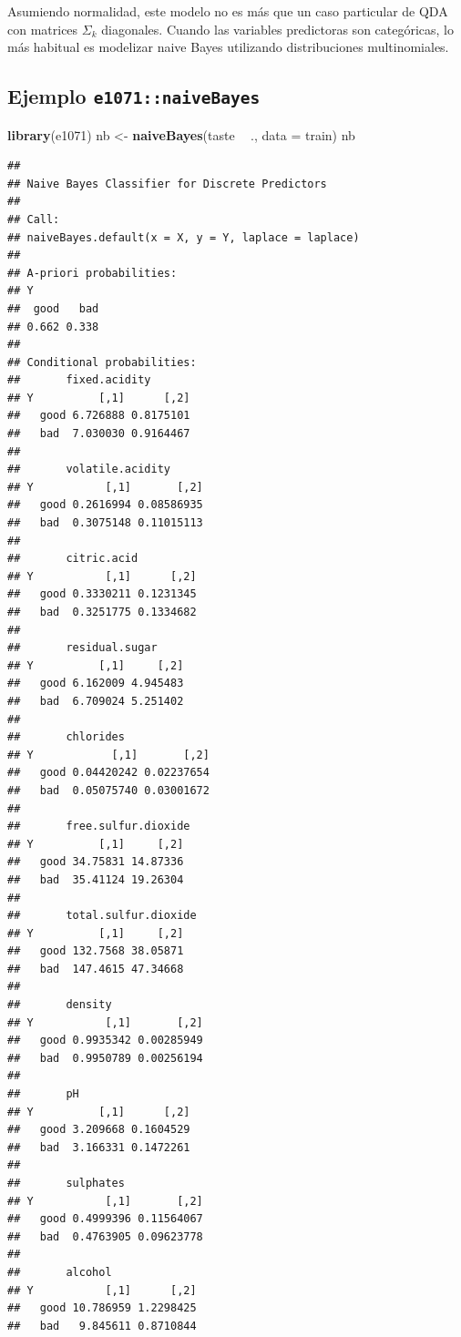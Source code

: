 \documentclass[
  spanish,
]{book}
\newenvironment{Shaded}{\begin{snugshade}}{\end{snugshade}}
\newcommand{\DataTypeTok}[1]{\textcolor[rgb]{0.13,0.29,0.53}{#1}}
\newcommand{\KeywordTok}[1]{\textcolor[rgb]{0.13,0.29,0.53}{\textbf{#1}}}
\newcommand{\NormalTok}[1]{#1}
\newcommand{\OperatorTok}[1]{\textcolor[rgb]{0.81,0.36,0.00}{\textbf{#1}}}
\newcommand{\StringTok}[1]{\textcolor[rgb]{0.31,0.60,0.02}{#1}}
\theoremstyle{break}
\theoremstyle{definition}
\theoremstyle{definition}
\theoremstyle{definition}
\theoremstyle{remark}
\begin{document}
Asumiendo normalidad, este modelo no es más que un caso particular de QDA con matrices \(\Sigma_k\) diagonales. Cuando las variables predictoras son categóricas, lo más habitual es modelizar naive Bayes utilizando distribuciones multinomiales.

\hypertarget{ejemplo-e1071naivebayes}{%
\subsection{\texorpdfstring{Ejemplo \texttt{e1071::naiveBayes}}{Ejemplo e1071::naiveBayes}}\label{ejemplo-e1071naivebayes}}

\begin{Shaded}
\begin{Highlighting}[]
\KeywordTok{library}\NormalTok{(e1071)}
\NormalTok{nb <-}\StringTok{ }\KeywordTok{naiveBayes}\NormalTok{(taste }\OperatorTok{~}\StringTok{ }\NormalTok{., }\DataTypeTok{data =}\NormalTok{ train)}
\NormalTok{nb}
\end{Highlighting}
\end{Shaded}

\begin{verbatim}
## 
## Naive Bayes Classifier for Discrete Predictors
## 
## Call:
## naiveBayes.default(x = X, y = Y, laplace = laplace)
## 
## A-priori probabilities:
## Y
##  good   bad 
## 0.662 0.338 
## 
## Conditional probabilities:
##       fixed.acidity
## Y          [,1]      [,2]
##   good 6.726888 0.8175101
##   bad  7.030030 0.9164467
## 
##       volatile.acidity
## Y           [,1]       [,2]
##   good 0.2616994 0.08586935
##   bad  0.3075148 0.11015113
## 
##       citric.acid
## Y           [,1]      [,2]
##   good 0.3330211 0.1231345
##   bad  0.3251775 0.1334682
## 
##       residual.sugar
## Y          [,1]     [,2]
##   good 6.162009 4.945483
##   bad  6.709024 5.251402
## 
##       chlorides
## Y            [,1]       [,2]
##   good 0.04420242 0.02237654
##   bad  0.05075740 0.03001672
## 
##       free.sulfur.dioxide
## Y          [,1]     [,2]
##   good 34.75831 14.87336
##   bad  35.41124 19.26304
## 
##       total.sulfur.dioxide
## Y          [,1]     [,2]
##   good 132.7568 38.05871
##   bad  147.4615 47.34668
## 
##       density
## Y           [,1]       [,2]
##   good 0.9935342 0.00285949
##   bad  0.9950789 0.00256194
## 
##       pH
## Y          [,1]      [,2]
##   good 3.209668 0.1604529
##   bad  3.166331 0.1472261
## 
##       sulphates
## Y           [,1]       [,2]
##   good 0.4999396 0.11564067
##   bad  0.4763905 0.09623778
## 
##       alcohol
## Y           [,1]      [,2]
##   good 10.786959 1.2298425
##   bad   9.845611 0.8710844
\end{verbatim}
\end{document}
